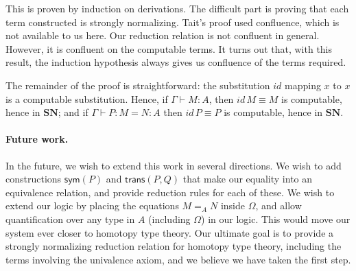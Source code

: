 \documentclass{easychair}
\newcommand{\SN}{\mathbf{SN}}
\begin{document}
This is proven by induction on derivations.  The difficult part is proving that each term constructed is strongly normalizing.  Tait's proof used confluence, which is not available to us here.  Our reduction relation is not confluent in general.  However, it is confluent on the computable terms.  It turns out that, with this result, the induction hypothesis always gives us
confluence of the terms required.

The remainder of the proof is straightforward: the substitution $id$ mapping $x$ to $x$ is a computable substitution.
Hence, if $\Gamma \vdash M : A$, then $id \, M \equiv M$ is computable, hence in $\SN$; and if $\Gamma \vdash P : M = N : A$ then $id \, P \equiv P$ is computable, hence in $\SN$.

\paragraph{Future work.}

In the future, we wish to extend this work in several directions.  We wish to add constructions $\mathsf{sym}(P)$ and $\mathsf{trans}(P,Q)$ that make our equality into an equivalence
relation, and provide reduction rules for each of these.  We wish to extend our logic by placing the equations $M =_A N$ inside $\Omega$, and allow quantification over any type in $A$ (including $\Omega$) in our logic.  This would move our system ever closer to homotopy type theory.  Our ultimate goal is to provide a strongly normalizing reduction relation for homotopy type theory, including the terms involving the univalence axiom, and we believe we have taken the first step.


\end{document}
